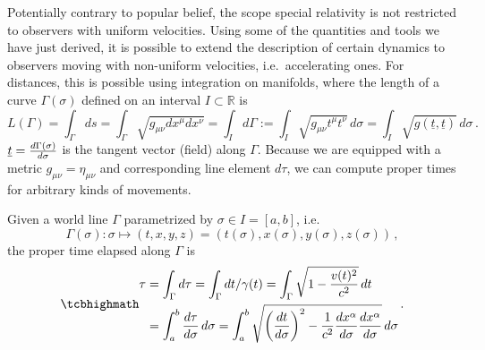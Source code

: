\documentclass[../relativity_main.tex]{subfiles}
\begin{document}
Potentially contrary to popular belief, the scope special relativity is not restricted to observers with uniform velocities. Using some of the quantities and tools we have just derived, it is possible to extend the description of certain dynamics to observers moving with non-uniform velocities, i.e.~accelerating ones. For distances, this is possible using integration on manifolds, where the length of a curve $\Gamma(\sigma)$ defined on an interval $I \subset \mathbb{R}$ is
\begin{equation}
	L(\Gamma) = \int_\Gamma ds = \int_\Gamma \sqrt{g_{\mu \nu} dx^\mu dx^\nu} = \int_I d\Gamma := \int_I \sqrt{g_{\mu \nu} t^\mu t^\nu} \, d\sigma = \int_I \sqrt{g(\underline{t}, \underline{t})} \, d\sigma \, .
\end{equation}
$\underline{t} = \dv{\Gamma(\sigma)}{\sigma}$ is the tangent vector (field) along $\Gamma$. Because we are equipped with a metric $g_{\mu \nu} = \eta_{\mu \nu}$ and corresponding line element $d\tau$, we can compute proper times for arbitrary kinds of movements.
\begin{post}\label{post:clock_postulate}
	Given a world line $\Gamma$ parametrized by $\sigma \in I = [a, b]$, i.e.
	\begin{equation*}
		\Gamma(\sigma): \sigma \mapsto (t, x, y, z) = (t(\sigma), x(\sigma), y(\sigma), z(\sigma)) \, ,
	\end{equation*}
	the proper time elapsed along $\Gamma$ is
	\begin{equation}\label{eq:proper_time_general}
		\eqbox{
		\begin{split}
		\tau & = \int_\Gamma d\tau = \int_\Gamma dt / \gamma(t) = \int_\Gamma \sqrt{1 - \frac{v(t)^2}{c^2}} \, dt
		\\
		&= \int_a^b \dv{\tau}{\sigma} \, d\sigma = \int_a^b \sqrt{\qty(\dv{t}{\sigma})^2 - \frac{1}{c^2} \dv{x^\alpha}{\sigma} \dv{x^\alpha}{\sigma}} \, d\sigma
		\end{split}
		} \, .
	\end{equation}
\end{post}
\end{document}
